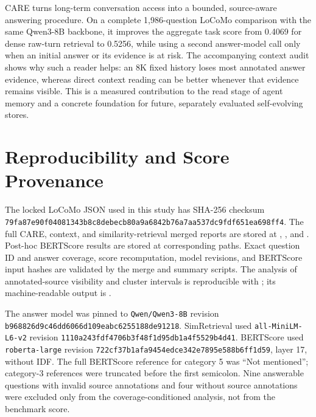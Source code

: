 \documentclass[11pt]{article}
\newcommand{\care}{\textsc{CARE}}
\begin{document}
\care{} turns long-term conversation access into a bounded, source-aware
answering procedure. On a complete 1,986-question LoCoMo comparison with
the same Qwen3-8B backbone, it improves the aggregate task score from
0.4069 for dense raw-turn retrieval to 0.5256, while using a second
answer-model call only when an initial answer or its evidence is at risk.
The accompanying context audit shows why such a reader helps: an 8K fixed
history loses most annotated answer evidence, whereas direct context
reading can be better whenever that evidence remains visible. This is a
measured contribution to the read stage of agent memory and a concrete
foundation for future, separately evaluated self-evolving stores.

\appendix
\section{Reproducibility and Score Provenance}
\label{app:reproducibility}

The locked LoCoMo JSON used in this study has SHA-256 checksum
\texttt{79fa87e90f040813\allowbreak 43b8c8debecb80a9\allowbreak a6842b76a7aa537d\allowbreak c9fdf651ea698ff4}.
The full \care{}, context, and similarity-retrieval merged reports are
stored at ,
, and
. Post-hoc BERTScore results
are stored at corresponding  paths. Exact question
ID and answer coverage, score recomputation, model revisions, and
BERTScore input hashes are validated by the merge and summary scripts.
The analysis of annotated-source visibility and cluster intervals is
reproducible with ; its
machine-readable output is
.

The answer model was pinned to \texttt{Qwen/Qwen3-8B} revision
\texttt{b968826d9c46dd60\allowbreak 66d109eabc625518\allowbreak 8de91218}.
SimRetrieval used \texttt{all-MiniLM-L6-v2} revision
\texttt{1110a243fdf4706b\allowbreak 3f48f1d95db1a4f5\allowbreak 529b4d41}.
BERTScore used \texttt{roberta-large} revision
\texttt{722cf37b1afa9454\allowbreak edce342e7895e588\allowbreak b6ff1d59}, layer 17,
without IDF. The full BERTScore reference for category 5 was
``Not mentioned''; category-3 references were truncated before the first
semicolon. Nine answerable questions with invalid source annotations
and four without source annotations were excluded only from the
coverage-conditioned analysis, not from the benchmark score.



\end{document}
